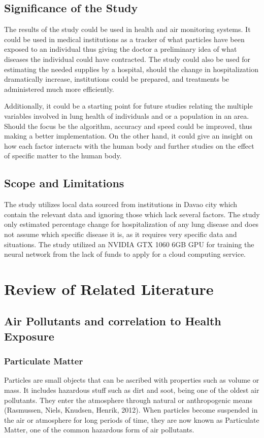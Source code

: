 \documentclass[10pt,11pt,12pt,oneside]{book}
\begin{document}
    \section{Significance of the Study}
    The results of the study could be used in health and air monitoring systems. It could be used in medical institutions as a tracker of what particles have been exposed to an individual thus giving the doctor a preliminary idea of what diseases the individual could have contracted. The study could also be used for estimating the needed supplies by a hospital, should the change in hospitalization dramatically increase, institutions could be prepared, and treatments be administered much more efficiently.
    
    Additionally, it could be a starting point for future studies relating the multiple variables involved in lung health of individuals and or a population in an area. Should the focus be the algorithm, accuracy and speed could be improved, thus making a better implementation. On the other hand, it could give an insight on how each factor interacts with the human body and further studies on the effect of specific matter to the human body.
    \section{Scope and Limitations}
    The study utilizes local data sourced from institutions in Davao city which contain the relevant data and ignoring those which lack several factors. The study only estimated percentage change for hospitalization of any lung disease and does not assume which specific disease it is, as it requires very specific data and situations. The study utilized an NVIDIA GTX 1060 6GB GPU for training the neural network from the lack of funds to apply for a cloud computing service.
\chapter{Review of Related Literature}
    \section{Air Pollutants and correlation to Health Exposure}
        \subsection{Particulate Matter}
        Particles are small objects that can be ascribed with properties such as volume or mass. It includes hazardous stuff such as dirt and soot, being one of the oldest air pollutants. They enter the atmosphere through natural or anthropogenic means (Rasmussen, Niels, Knudsen, Henrik, 2012). When particles become suspended in the air or atmosphere for long periods of time, they are now known as Particulate Matter, one of the common hazardous form of air pollutants. 
        
\end{document}
